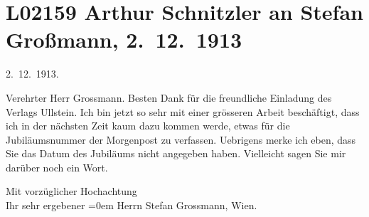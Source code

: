 

\section[Arthur Schnitzler an Stefan Großmann, 2. 12. 1913]{L02159 Arthur Schnitzler an Stefan Großmann, 2. 12. 1913}
\nopagebreak{}
\rehead{ }\normalsize\beginnumbering{}
\toendnotes[C]{\smallbreak\pagebreak[2]}
\toendnotes[C]{\smallbreak}
\pstart
           \raggedleft{}{\pb}2. 12. 1913.\pend
           
\pstart\center{}Verehrter Herr Grossmann.\pend\vspace{0.5em}
\pstart
           Besten Dank für die freundliche Einladung des Verlags Ullstein. Ich bin jetzt so sehr mit einer grösseren Arbeit beschäftigt, dass ich in
               der nächsten Zeit kaum dazu kommen werde, etwas für die Jubiläumsnummer der Morgenpost zu verfassen. Uebrigens merke ich eben,
               dass Sie das Datum des Jubiläums nicht angegeben haben. Vielleicht sagen Sie mir
               darüber noch ein Wort.\pend
           
\pstart
           Mit vorzüglicher Hochachtung{\\[\baselineskip]}Ihr sehr ergebener\pend
           \leftskip=0em{}{\vspace{1\baselineskip}}
\pstart
           Herrn Stefan Grossmann, Wien.\pend
           \endnumbering{}  
      